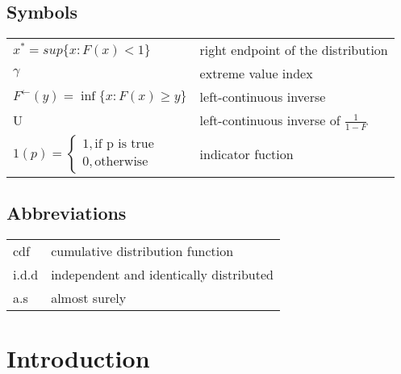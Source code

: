 \documentclass[english,12pt,a4paper,pdftex,sci,utf8]{aaltothesis} %
\begin{document}
\newpage


\thesistableofcontents



\subsection*{Symbols}

\begin{tabular}{ll}
$x^*=sup\{x : F(x)<1\}$  & right endpoint of the distribution  \\
$\gamma$ & extreme value index \\
$F^{\leftarrow}(y) = \inf\{x:F(x) \geq y \}$ & left-continuous inverse \\
U & left-continuous inverse of $\frac{1}{1-F}$ \\
$1(p)=
\begin{cases}
1 , \textrm{if p is true}\\
0, \textrm{otherwise}
\end{cases}$ & indicator fuction
\end{tabular}

\subsection*{Abbreviations}

\begin{tabular}{ll}
cdf         & cumulative distribution function \\
i.d.d      & independent and identically distributed \\
a.s         & almost surely\\
\end{tabular}


\cleardoublepage

\section{Introduction}

\thispagestyle{empty}
\end{document}
